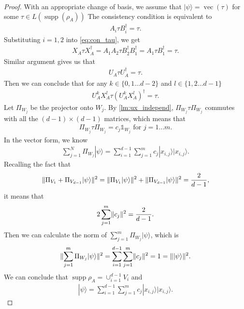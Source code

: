 \documentclass[11pt,letterpaper]{article}
\newcommand{\ket}[1]{|#1\rangle}
\newcommand{\x}{\otimes}
\DeclarePairedDelimiter{\norm}{\lVert}{\rVert}
\DeclareMathOperator{\vc}{vec}
\DeclareMathOperator{\supp}{supp}
\newcommand{\1}{\mathbb{1}}
\theoremstyle{definition}
\begin{document}
\begin{proof}
With an appropriate change of basis, we 
assume that $\ket{\psi} = \vc(\tau)$ for some $\tau \in L(\supp(\rho_A))$
The consistency condition is equivalent to
\begin{align}
\label{eq:con_tau}
	A_i \tau B_i^\dagger = \tau.
\end{align}
Substituting $i=1,2$ into \cref{eq:con_tau}, we get 
\begin{align}
	X_A \tau X_A^\dagger = A_1A_2\tau B_2^\dagger B_1^\dagger = A_1\tau B_1^\dagger = \tau.
\end{align}
Similar argument gives us that 
\begin{align}
	U_A \tau U_A^\dagger = \tau.
\end{align}
Then we can conclude that for any $k \in \{0,1 \dots d-2\}$ and $l \in \{1,2\dots d-1\}$
\begin{align}
	U_A^kX_A^l \tau (U_A^kX_A^l)^\dagger = \tau.
\end{align}
Let $\Pi_{W_j}$ be the projector onto $W_j$. 
By \cref{lm:ux_independ}, $\Pi_{W_j} \tau \Pi_{W_j}$ commutes with all the $(d-1) \times (d-1)$ matrices, which means that 
\begin{align}
	\label{eq:d-1}
	\Pi_{W_j} \tau \Pi_{W_j}  = c_j \1_{W_j} \text{ for } j = 1\dots m.
\end{align}
In the vector form, we know
\begin{align}
	\sum_{j =1}^N \Pi_{W_j} \ket{\psi} =\sum_{i=1}^{d-1} \sum_{j=1}^m c_j \ket{x_{i,j}}\ket{x_{i,j}}. 
\end{align}
Recalling the fact that 
\begin{align}
\norm{ \Pi_{V_1} + \Pi_{V_{d-1}} \ket{\psi}}^2 = \norm{\Pi_{V_1} \ket{\psi}}^2 + \norm{\Pi_{V_{d-1}} \ket{\psi}}^2 = \frac{2}{d-1},
 \end{align}
 it means that 
 \begin{align}
 	2 \sum_{j=1}^m \norm{c_j}^2 = \frac{2}{d-1}.
 \end{align}
 Then we can calculate the norm of $\sum_{j =1}^m \Pi_{W_j} \ket{\psi}$, which is
 \begin{align}
 \norm{\sum_{j =1}^m \Pi_{W_j} \ket{\psi}}^2 = \sum_{i=1}^{d-1} \sum_{j=1}^m \norm{c_j}^2 = 1 = \norm{\ket{\psi}}^2.
 \end{align}
 We can conclude that $\supp{\rho_A} = \cup_{i=1}^{d-1} V_i$ and 
 \begin{align}
 	\ket{\psi} = \sum_{i=1}^{d-1}\sum_{j=1}^m c_j \ket{x_{i,j}}\ket{x_{i,j}}.
 \end{align}
 

\end{proof}
\end{document}
